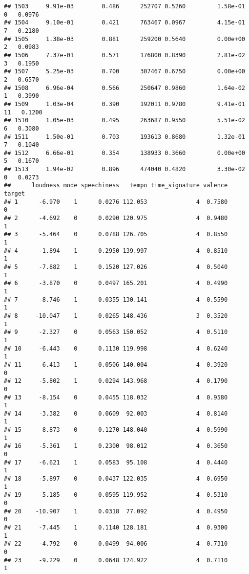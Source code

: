 \documentclass[
]{article}
\begin{document}
\begin{verbatim}
## 1503     9.91e-03        0.486      252707 0.5260         1.58e-01   0   0.0976
## 1504     9.10e-01        0.421      763467 0.0967         4.15e-01   7   0.2180
## 1505     1.38e-03        0.881      259200 0.5640         0.00e+00   2   0.0983
## 1506     7.37e-01        0.571      176800 0.8390         2.81e-02   3   0.1950
## 1507     5.25e-03        0.700      307467 0.6750         0.00e+00   2   0.6570
## 1508     6.96e-04        0.566      250647 0.9860         1.64e-02   1   0.3990
## 1509     1.03e-04        0.390      192011 0.9780         9.41e-01  11   0.1200
## 1510     1.05e-03        0.495      263687 0.9550         5.51e-02   6   0.3080
## 1511     1.50e-01        0.703      193613 0.8680         1.32e-01   7   0.1040
## 1512     6.66e-01        0.354      138933 0.3660         0.00e+00   5   0.1670
## 1513     1.94e-02        0.896      474040 0.4820         3.30e-02   0   0.0273
##      loudness mode speechiness   tempo time_signature valence target
## 1      -6.970    1      0.0276 112.053              4  0.7580      0
## 2      -4.692    0      0.0290 120.975              4  0.9480      1
## 3      -5.464    0      0.0788 126.705              4  0.8550      1
## 4      -1.894    1      0.2950 139.997              4  0.8510      1
## 5      -7.882    1      0.1520 127.026              4  0.5040      1
## 6      -3.870    0      0.0497 165.201              4  0.4990      1
## 7      -8.746    1      0.0355 130.141              4  0.5590      1
## 8     -10.047    1      0.0265 148.436              3  0.3520      1
## 9      -2.327    0      0.0563 150.052              4  0.5110      1
## 10     -6.443    0      0.1130 119.998              4  0.6240      1
## 11     -6.413    1      0.0506 140.004              4  0.3920      0
## 12     -5.802    1      0.0294 143.968              4  0.1790      0
## 13     -8.154    0      0.0455 118.032              4  0.9580      1
## 14     -3.382    0      0.0609  92.003              4  0.8140      1
## 15     -8.873    0      0.1270 148.040              4  0.5990      1
## 16     -5.361    1      0.2300  98.012              4  0.3650      0
## 17     -6.621    1      0.0583  95.108              4  0.4440      1
## 18     -5.897    0      0.0437 122.035              4  0.6950      1
## 19     -5.185    0      0.0595 119.952              4  0.5310      0
## 20    -10.907    1      0.0318  77.092              4  0.4950      0
## 21     -7.445    1      0.1140 128.181              4  0.9300      1
## 22     -4.792    0      0.0499  94.006              4  0.7310      0
## 23     -9.229    0      0.0648 124.922              4  0.7110      1

\end{verbatim}
\end{document}

